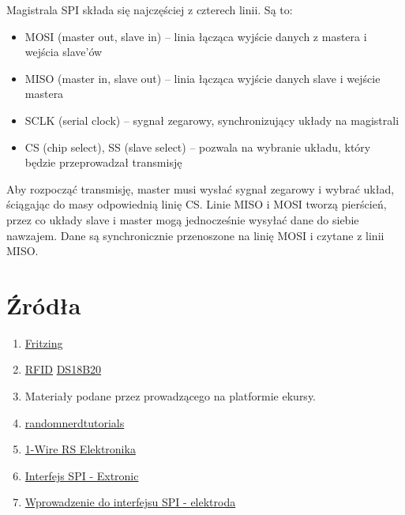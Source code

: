 \documentclass[polish,a4paper]{article}
\begin{document}
	Magistrala SPI składa się najczęściej z czterech linii. Są to:
	\begin{itemize}
		\item MOSI (master out, slave in) – linia łącząca wyjście danych z mastera i wejścia slave’ów
		\item MISO (master in, slave out) – linia łącząca wyjście danych slave i wejście mastera
		\item SCLK (serial clock) – sygnał zegarowy, synchronizujący układy na magistrali
		\item CS (chip select), SS (slave select) – pozwala na wybranie układu, który będzie przeprowadzał transmisję
	\end{itemize}
	
	Aby rozpocząć transmisję, master musi wysłać sygnał zegarowy i wybrać układ, ściągając do masy odpowiednią linię CS. Linie MISO i MOSI tworzą pierścień, przez co układy slave i master mogą jednocześnie wysyłać dane do siebie nawzajem. Dane są synchronicznie przenoszone na linię MOSI i czytane z linii MISO. 
	
	\newpage
	\section*{Źródła}
	\begin{enumerate}
		\item \href{https://fritzing.org/}{Fritzing}
		\item \href{https://github.com/miguelbalboa/rfid/blob/master/doc/fritzing/RFID-RC522-v2.fzpz}{RFID}
		\href{https://github.com/adafruit/Fritzing-Library/blob/master/parts/DS18B20%201-Wire%20Temperature%20Sensor%20Probe%20Cable.fzpz}{DS18B20}
		\item Materiały podane przez prowadzącego na platformie ekursy.
		\item \href{https://randomnerdtutorials.com}{randomnerdtutorials}
		\item \href{https://www.youtube.com/watch?v=TCMo1yASYvw}{1-Wire RS Elektronika}
		\item \href{http://extronic.pl/content/60-kurs-xmega-interfejs-spi}{Interfejs SPI - Extronic}
		\item \href{https://www.elektroda.pl/rtvforum/topic3551692.html}{Wprowadzenie do interfejsu SPI - elektroda} 
	\end{enumerate}
	\begingroup
	\hypersetup{hidelinks}
	\tableofcontents
	\endgroup
\end{document}

